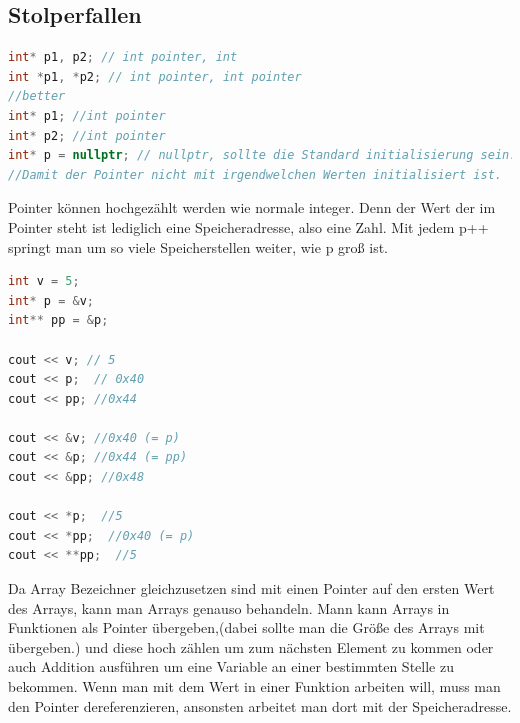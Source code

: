 \subsection{Stolperfallen}
\begin{lstlisting}[language=C++]
int* p1, p2; // int pointer, int
int *p1, *p2; // int pointer, int pointer
//better
int* p1; //int pointer
int* p2; //int pointer
int* p = nullptr; // nullptr, sollte die Standard initialisierung sein. 
//Damit der Pointer nicht mit irgendwelchen Werten initialisiert ist. 
\end{lstlisting}
Pointer können hochgezählt werden wie normale integer. Denn der Wert der im Pointer steht ist lediglich eine Speicheradresse, also eine Zahl. Mit jedem p++ springt man um so viele Speicherstellen weiter, wie p groß ist. 
\begin{lstlisting}[language=C++]
int v = 5; 
int* p = &v; 
int** pp = &p;
 
cout << v; // 5
cout << p;  // 0x40
cout << pp; //0x44

cout << &v; //0x40 (= p)
cout << &p; //0x44 (= pp)
cout << &pp; //0x48

cout << *p;  //5
cout << *pp;  //0x40 (= p)
cout << **pp;  //5
\end{lstlisting}
Da Array Bezeichner gleichzusetzen sind mit einen Pointer auf den ersten Wert des Arrays, kann man Arrays genauso behandeln. Mann kann Arrays in Funktionen als Pointer übergeben,(dabei sollte man die Größe des Arrays mit übergeben.) und diese hoch zählen um zum nächsten Element zu kommen oder auch Addition ausführen um eine Variable an einer bestimmten Stelle zu bekommen. Wenn man mit dem Wert in einer Funktion arbeiten will, muss man den Pointer dereferenzieren, ansonsten arbeitet man dort mit der Speicheradresse. \\

